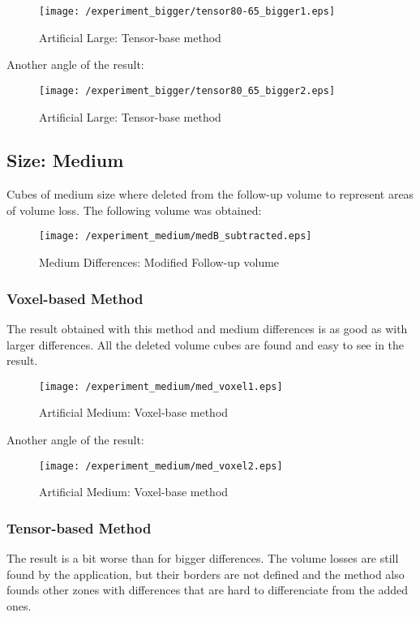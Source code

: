 \begin{figure}[H]
  \centering
  \texttt{[image: /experiment\_bigger/tensor80-65\_bigger1.eps]}
  \caption{Artificial Large: Tensor-base method}
  \label{tensor_large1}
\end{figure}

Another angle of the result:

\begin{figure}[H]
  \centering
  \texttt{[image: /experiment\_bigger/tensor80\_65\_bigger2.eps]}
  \caption{Artificial Large: Tensor-base method}
  \label{tensor_large2}
\end{figure}


\subsection{Size: Medium}
Cubes of medium size where deleted from the follow-up volume to
represent areas of volume loss. The following volume was obtained:

\begin{figure}[H]
  \centering
  \texttt{[image: /experiment\_medium/medB\_subtracted.eps]}
  \caption{Medium Differences: Modified Follow-up volume}
  \label{largeB}
\end{figure}

\subsubsection{Voxel-based Method}
The result obtained with this method and medium differences is as good
as with larger differences. All the deleted volume cubes are found and
easy to see in the result.

\begin{figure}[H]
  \centering
  \texttt{[image: /experiment\_medium/med\_voxel1.eps]}
  \caption{Artificial Medium: Voxel-base method}
  \label{voxel_med1}
\end{figure}

Another angle of the result:

\begin{figure}[H]
  \centering
  \texttt{[image: /experiment\_medium/med\_voxel2.eps]}
  \caption{Artificial Medium: Voxel-base method}
  \label{voxel_med2}
\end{figure}

\subsubsection{Tensor-based Method}
The result is a bit worse than for bigger differences. The volume
losses are still found by the application, but their borders are not
defined and the method also founds other zones with differences that
are hard to differenciate from the added ones.

